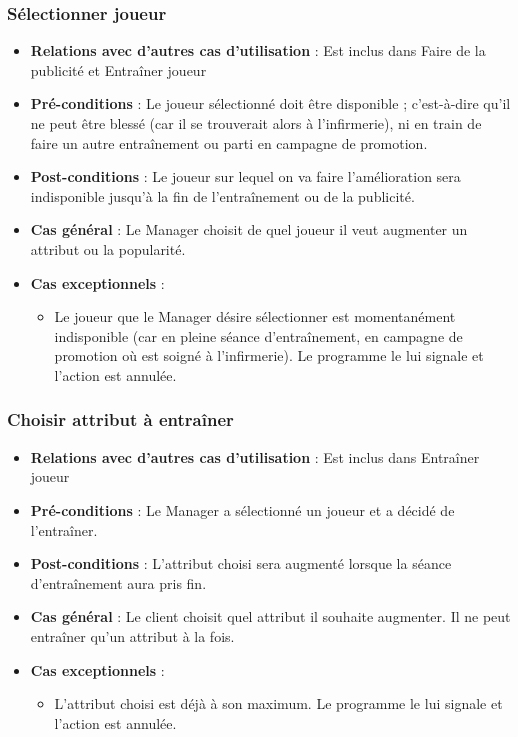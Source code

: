 \documentclass[a4paper,titlepage]{scrreprt}
\begin{document}
    \subsubsection{Sélectionner joueur}
      \begin{itemize}
        \item \textbf{Relations avec d'autres cas d'utilisation}  : Est inclus dans Faire de la publicité et Entraîner joueur
        \item \textbf{Pré-conditions} : Le joueur sélectionné doit être disponible ; c’est-à-dire qu’il ne peut être blessé (car il se trouverait alors à l'infirmerie), ni en train de faire un autre entraînement ou parti en campagne de promotion.
        \item \textbf{Post-conditions} : Le joueur sur lequel on va faire l’amélioration sera indisponible jusqu’à la fin de l’entraînement ou de la publicité.
        \item \textbf{Cas général} : Le Manager choisit de quel joueur il veut augmenter un attribut ou la popularité. 
        \item \textbf{Cas exceptionnels} : 
        \begin{itemize}
            \item Le joueur que le Manager désire sélectionner est momentanément indisponible (car en pleine séance d'entraînement, en campagne de promotion où est soigné à l'infirmerie). Le programme le lui signale et l'action est annulée.
          \end{itemize}
      \end{itemize}
    \subsubsection{Choisir attribut à entraîner}
      \begin{itemize}
        \item \textbf{Relations avec d'autres cas d'utilisation}  : Est inclus dans Entraîner joueur
        \item \textbf{Pré-conditions} : Le Manager a sélectionné un joueur et a décidé de l'entraîner.
        \item \textbf{Post-conditions} : L'attribut choisi sera augmenté lorsque la séance d'entraînement aura pris fin.
        \item \textbf{Cas général} : Le client choisit quel attribut il souhaite augmenter. Il ne peut entraîner qu’un attribut à la fois. 
        \item \textbf{Cas exceptionnels} :
        \begin{itemize}
            \item L'attribut choisi est déjà à son maximum. Le programme le lui signale et l'action est annulée.
          \end{itemize}
      \end{itemize}
\end{document}
